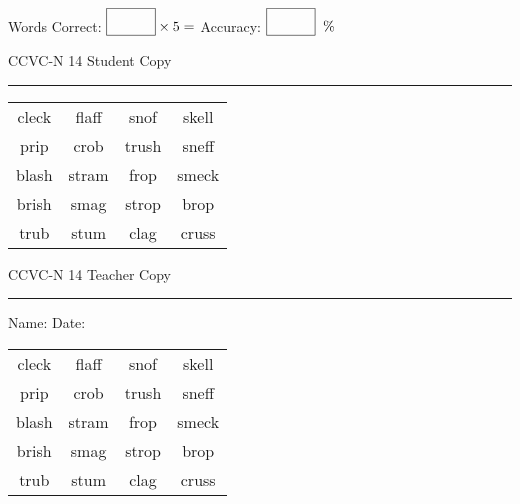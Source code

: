 \documentclass{memoir}
\begin{document}
\small

Words Correct: $\fbox{\phantom{\huge 100}} \times 5 = $ Accuracy: $\fbox{\phantom{\huge 100}}\;\; \%$ 

\vfill

\newpage


\footnotesize \noindent
CCVC-N 14 \hfill Student Copy
\smallskip
\hrule

\Large

\setlength{\tabcolsep}{14pt}
\def\arraystretch{3}

{\selectfont


\begin{vplace}[0.5]
\begin{center}
\begin{tabular}{cccc}
cleck             & flaff & snof & skell \\
prip & crob & trush & sneff \\
blash & stram & frop & smeck \\
brish & smag & strop & brop   \\
trub & stum & clag & cruss \\
\end{tabular}
\end{center}
\end{vplace}

}

\newpage

\footnotesize \noindent
CCVC-N 14 \hfill Teacher Copy
\smallskip
\hrule

\small

\vfill

\noindent
Name: \underline{\hspace{1.75in}} \hfill Date: \underline{\hspace{1in}}

\Large

{\selectfont


\begin{vplace}[0.5]
\begin{center}
\begin{tabular}{cccc}
cleck             & flaff & snof & skell \\
prip & crob & trush & sneff \\
blash & stram & frop & smeck \\
brish & smag & strop & brop   \\
trub & stum & clag & cruss \\
\end{tabular}
\end{center}
\end{vplace}



}
\end{document}
